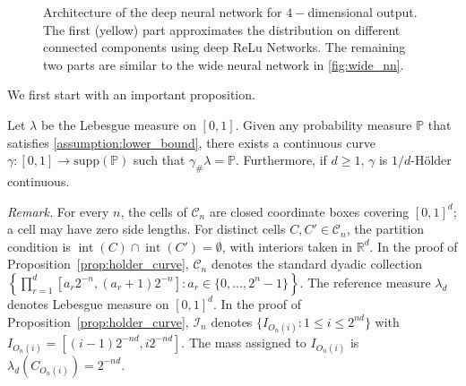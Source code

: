 \begin{figure}[!htb]
{
}

\caption{Architecture of the deep neural network for $ 4-$dimensional output. The first (yellow) part approximates the distribution on different connected components using deep ReLu Networks. The remaining two parts are similar to the wide neural network in \cref{fig:wide_nn}.}
\label{fig:deep_nn}
\end{figure}
We first start with an important proposition. 
\begin{proposition}\label{prop:holder_curve}
Let $ \lambda $ be the Lebesgue measure on $ [ 0,1]$. Given any probability measure $ \mathbb{P}$ that satisfies \cref{assumption:lower_bound}, there exists a continuous curve $ \gamma : [0,1]\rightarrow \text{supp}(\mathbb{P})$ such that $\gamma _{\#} \lambda =\mathbb{P}$. Furthermore, if $d \geqslant 1$, $\gamma$ is $ 1/d$-Hölder continuous.
\end{proposition}

\noindent\textit{Remark.} For every $n$, the cells of $\mathcal C_n$ are closed coordinate boxes covering $[0,1]^d$; a cell may have zero side lengths. For distinct cells $C,C'\in\mathcal C_n$, the partition condition is $\operatorname{int}(C)\cap\operatorname{int}(C')=\emptyset$, with interiors taken in $\mathbb R^d$. In the proof of Proposition~\ref{prop:holder_curve}, $\mathcal C_n$ denotes the standard dyadic collection $\left\{\prod_{r=1}^d[a_r2^{-n},(a_r+1)2^{-n}]:a_r\in\{0,\ldots,2^n-1\}\right\}$. The reference measure $\lambda_d$ denotes Lebesgue measure on $[0,1]^d$. In the proof of Proposition~\ref{prop:holder_curve}, $\mathcal I_n$ denotes $\{I_{O_n(i)}:1\leqslant i\leqslant2^{nd}\}$ with $I_{O_n(i)}=[(i-1)2^{-nd},i2^{-nd}]$. The mass assigned to $I_{O_n(i)}$ is $\lambda_d(C_{O_n(i)})=2^{-nd}$.

